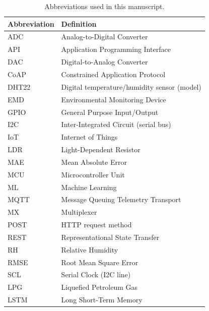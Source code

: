 ﻿\documentclass[journal]{IEEEtran}
\begin{document}
\begin{table}[!t]
    \centering
    \caption{Abbreviations used in this manuscript.}
    \label{tab:abbreviations}
    \renewcommand{\arraystretch}{1.08}
    \setlength{\tabcolsep}{5pt}

    \begin{tabular}{ll}
        \toprule
        \textbf{Abbreviation} & \textbf{Definition} \\
        \midrule

        ADC  & Analog-to-Digital Converter \\
        API  & Application Programming Interface \\
        DAC  & Digital-to-Analog Converter \\
        CoAP & Constrained Application Protocol \\
        DHT22 & Digital temperature/humidity sensor (model) \\
        EMD  & Environmental Monitoring Device \\
        GPIO & General Purpose Input/Output \\
        I2C  & Inter-Integrated Circuit (serial bus) \\
        IoT  & Internet of Things \\
        LDR  & Light-Dependent Resistor \\
        MAE  & Mean Absolute Error \\
        MCU  & Microcontroller Unit \\
        ML   & Machine Learning \\
        MQTT & Message Queuing Telemetry Transport \\
        MX   & Multiplexer \\
        POST & HTTP request method \\
        REST & Representational State Transfer \\
        RH   & Relative Humidity \\
        RMSE & Root Mean Square Error \\
        SCL  & Serial Clock (I2C line) \\
        LPG  & Liquefied Petroleum Gas \\
        LSTM & Long Short-Term Memory \\

        \bottomrule
    \end{tabular}
\end{table}


\end{document}
